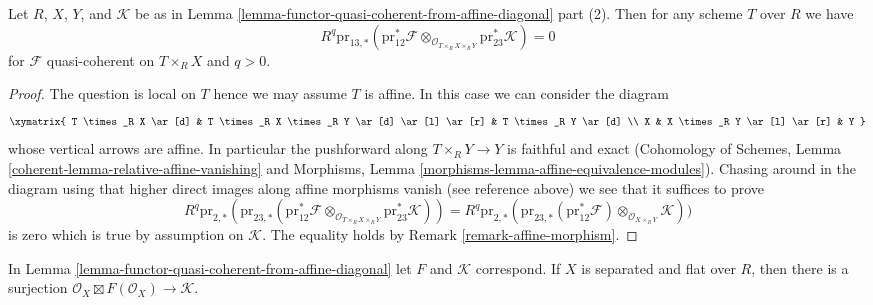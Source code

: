 \begin{lemma}
\label{lemma-persistence-exactness}
Let $R$, $X$, $Y$, and $\mathcal{K}$ be as in
Lemma \ref{lemma-functor-quasi-coherent-from-affine-diagonal} part (2).
Then for any scheme $T$ over $R$ we have
$$
R^q\text{pr}_{13, *}(\text{pr}_{12}^*\mathcal{F}
\otimes_{\mathcal{O}_{T \times_R X \times_R Y}}
\text{pr}_{23}^*\mathcal{K}) = 0
$$
for $\mathcal{F}$ quasi-coherent on $T \times_R X$ and $q > 0$.
\end{lemma}

\begin{proof}
The question is local on $T$ hence we may assume $T$ is affine.
In this case we can consider the diagram
$$
\xymatrix{
T \times_R X \ar[d] &
T \times_R X \times_R Y \ar[d] \ar[l] \ar[r] &
T \times_R Y \ar[d] \\
X &
X \times_R Y \ar[l] \ar[r] &
Y
}
$$
whose vertical arrows are affine. In particular the pushforward along
$T \times_R Y \to Y$ is faithful and exact (Cohomology of Schemes,
Lemma \ref{coherent-lemma-relative-affine-vanishing} and
Morphisms, Lemma \ref{morphisms-lemma-affine-equivalence-modules}).
Chasing around in the diagram using that higher direct images along
affine morphisms vanish (see reference above) we see that
it suffices to prove
$$
R^q\text{pr}_{2, *}(
\text{pr}_{23, *}(\text{pr}_{12}^*\mathcal{F}
\otimes_{\mathcal{O}_{T \times_R X \times_R Y}}
\text{pr}_{23}^*\mathcal{K})) =
R^q\text{pr}_{2, *}(
\text{pr}_{23, *}(\text{pr}_{12}^*\mathcal{F})
\otimes_{\mathcal{O}_{X \times_R Y}}
\mathcal{K}))
$$
is zero which is true by assumption on $\mathcal{K}$.
The equality holds by Remark \ref{remark-affine-morphism}.
\end{proof}

\begin{lemma}
\label{lemma-functor-quasi-coherent-from-separated}
In Lemma \ref{lemma-functor-quasi-coherent-from-affine-diagonal}
let $F$ and $\mathcal{K}$ correspond. If $X$ is separated and
flat over $R$, then there is a surjection
$\mathcal{O}_X \boxtimes F(\mathcal{O}_X) \to \mathcal{K}$.
\end{lemma}

